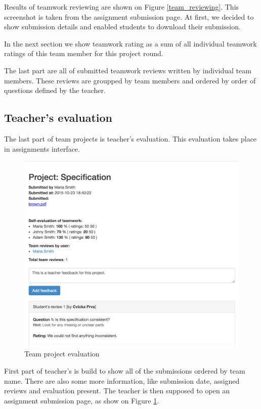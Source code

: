 Results of teamwork reviewing are shown on Figure \ref{team_reviewing}. This screenshot is taken from the assignment submission page. At first, we decided to show submission details and enabled students to download their submission.

In the next section we show teamwork rating as a sum of all individual teamwork ratings of this team member for this project round. 

The last part are all of submitted teamwork reviews written by individual team members. These reviews are groupped by team members and ordered by order of questions defined by the teacher.


\subsection{Teacher's evaluation}
The last part of team projects is teacher's evaluation. This evaluation takes place in assignments interface.

\begin{figure}[h]
    \centering
    \includegraphics[width=\textwidth]{images/teamprojectevaluation.png}
    \caption{Team project evaluation}
    \label{team_submission_admin}
\end{figure}

First part of teacher's is build to show all of the submissions ordered by team name. There are also some more information, like submission date, assigned reviews and evaluation present. The teacher is then supposed to open an assignment submission page, as show on Figure \ref{team_submission_admin}.

